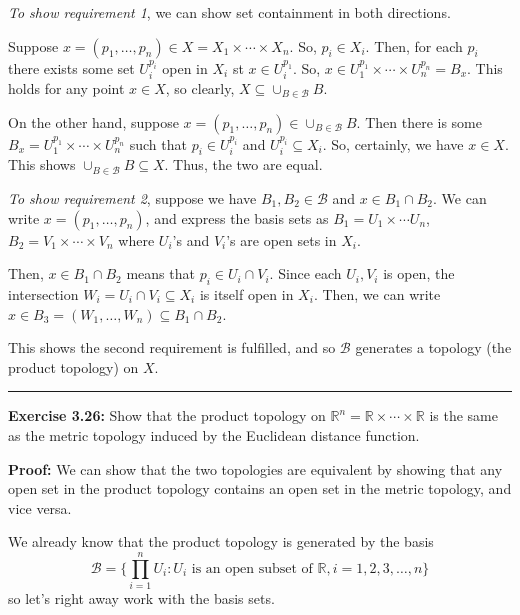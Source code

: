 \documentclass{article}
\begin{document}
\emph{To show requirement 1}, we can show set containment in both directions.

\vskip 0.5cm

Suppose $x = (p_1, \dots, p_n) \in X = X_1 \times \cdots \times X_n$. So, $p_i \in X_i$. Then, for each $p_i$ there exists some set $U_i^{p_i}$ open in $X_i$ st $x \in U_i^{p_1}$. So, $x \in U_1^{p_1} \times \cdots \times U_n^{p_n} = B_x$. This holds for any point $x \in X$, so clearly, $X \subseteq \cup_{B \in \mathcal B} B$.

\vskip 0.5cm

On the other hand, suppose $x = (p_1, \dots, p_n) \in \cup_{B \in \mathcal B} B$. Then there is some $B_x = U_1^{p_1} \times \cdots \times U_n^{p_n} $ such that $p_i \in U_i^{p_i}$ and $U_i^{p_i} \subseteq X_i$. So, certainly, we have $x \in X$. This shows $\cup_{B \in \mathcal B} B \subseteq X$. Thus, the two are equal.

\vskip 0.5cm

\emph{To show requirement 2}, suppose we have $B_1, B_2 \in \mathcal B$ and $x \in B_1 \cap B_2$. We can write $x = (p_1, \dots, p_n) $, and express the basis sets as $B_1 = U_1 \times \cdots U_n$, $B_2 = V_1 \times \cdots \times V_n$ where $U_i$'s and $V_i$'s are open sets in $X_i$.

\vskip 0.5cm

Then, $x \in B_1 \cap B_2$ means that $p_i \in U_i \cap V_i$. Since each $U_i, V_i$ is open, the intersection $W_i = U_i \cap V_i \subseteq X_i$ is itself open in $X_i$. Then, we can write $x \in B_3 = (W_1, \dots, W_n) \subseteq B_1 \cap B_2$.  

\vskip 0.5cm

This shows the second requirement is fulfilled, and so $\mathcal B$ generates a topology (the product topology) on $X$.

\vskip 0.5cm
\hrule
\vskip 0.5cm

\textbf{Exercise 3.26:} Show that the product topology on $\mathbb{R}^n = \mathbb{R} \times \cdots \times \mathbb{R}$ is the same as the metric topology induced by the Euclidean distance function.

\vskip 0.5cm

\textbf{Proof:} We can show that the two topologies are equivalent by showing that any open set in the product topology contains an open set in the metric topology, and vice versa.

\vskip 0.5cm
We already know that the product topology is generated by the basis 
\[ \mathcal{B} = \{ \prod_{i = 1}^{n} U_i : U_i \text{ is an open subset of } \mathbb{R}, i = 1,2,3,\dots,n \} \]
so let's right away work with the basis sets. 
\end{document}
